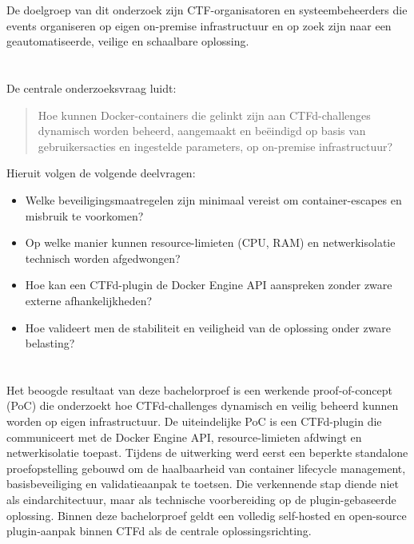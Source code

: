 De doelgroep van dit onderzoek zijn CTF-organisatoren en systeembeheerders die events organiseren op eigen on-premise infrastructuur en op zoek zijn naar een geautomatiseerde, veilige en schaalbare oplossing.

\section{}%
\label{sec:onderzoeksvraag}

De centrale onderzoeksvraag luidt:

\begin{quote}
  Hoe kunnen Docker-containers die gelinkt zijn aan CTFd-challenges dynamisch worden beheerd, aangemaakt en beëindigd op basis van gebruikersacties en ingestelde parameters, op on-premise infrastructuur?
\end{quote}

Hieruit volgen de volgende deelvragen:

\begin{itemize}
  \item Welke beveiligingsmaatregelen zijn minimaal vereist om container-escapes en misbruik te voorkomen?
  \item Op welke manier kunnen resource-limieten (CPU, RAM) en netwerkisolatie technisch worden afgedwongen?
  \item Hoe kan een CTFd-plugin de Docker Engine API aanspreken zonder zware externe afhankelijkheden?
  \item Hoe valideert men de stabiliteit en veiligheid van de oplossing onder zware belasting?
\end{itemize}

\section{}%
\label{sec:onderzoeksdoelstelling}

Het beoogde resultaat van deze bachelorproef is een werkende proof-of-concept (PoC) die onderzoekt hoe CTFd-challenges dynamisch en veilig beheerd kunnen worden op eigen infrastructuur. De uiteindelijke PoC is een CTFd-plugin die communiceert met de Docker Engine API, resource-limieten afdwingt en netwerkisolatie toepast. Tijdens de uitwerking werd eerst een beperkte standalone proefopstelling gebouwd om de haalbaarheid van container lifecycle management, basisbeveiliging en validatieaanpak te toetsen. Die verkennende stap diende niet als eindarchitectuur, maar als technische voorbereiding op de plugin-gebaseerde oplossing. Binnen deze bachelorproef geldt een volledig self-hosted en open-source plugin-aanpak binnen CTFd als de centrale oplossingsrichting.

